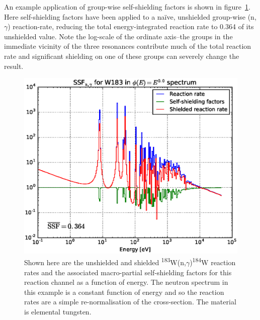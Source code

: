 An example application of group-wise self-shielding factors is shown in figure~\ref{fig:W183_gamma}. Here self-shielding factors have been applied to a na\"ive, unshielded group-wise (n,$\gamma$) reaction-rate, reducing the total energy-integrated reaction rate to 0.364 of its unshielded value. Note the log-scale of the ordinate axis--the groups in the immediate vicinity of the three resonances contribute much of the total reaction rate and significant shielding on one of these groups can severely change the result.

\begin{figure}[H]
  \centering
  \includegraphics[width=\linewidth]{W183_gamma}
  \caption[Unshielded and shielded reaction rates for $^{183}$W(n,$\gamma$)$^{184}$W.]{Shown here are the unshielded and shielded \textsuperscript{183}W(n,$\gamma$)\textsuperscript{184}W reaction rates and the associated macro-partial self-shielding factors for this reaction channel as a function of energy. The neutron spectrum in this example is a constant function of energy and so the reaction rates are a simple re-normalisation of the cross-section. The material is elemental tungsten.}
  \label{fig:W183_gamma}
\end{figure}

